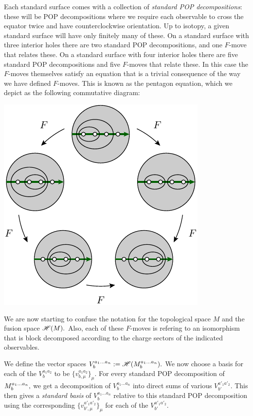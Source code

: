 \documentclass[aps, prl, letterpaper, twocolumn, superscriptaddress, notitlepage, 10pt]{revtex4-1}
\begin{document}
Each standard surface comes with a collection of
\emph{standard POP decompositions}:
these will be POP decompositions where we require each
observable to cross the
equator twice and have counterclockwise orientation.
Up to isotopy, a given standard surface will have only finitely many of these.
On a standard surface with three
interior holes there are two standard POP decompositions,
and one $F$-move that relates these.
On a standard surface with four interior holes there are five 
standard POP decompositions and five $F$-moves that relate these.
In this case the $F$-moves themselves satisfy an equation
that is a trivial consequence of the way we have defined $F$-moves.
This is known as the pentagon equation, which we depict as
the following commutative diagram:
\begin{center}
\includegraphics[]{pic-pentagon.pdf}
\end{center}
We are now starting to confuse the notation 
for the topological space $M$ and the fusion space $\mathscr{H}(M).$
Also, each of these $F$-moves is refering to an isomorphism 
that is block decomposed according to the charge sectors 
of the indicated observables.

We define the vector spaces 
$ V^{a_1...a_n}_{b} := \mathscr{H}(M^{a_1...a_n}_{b}).$ 
We now choose a basis for each of the
$V^{a_1a_2}_{b}$ to be $\{v^{a_1a_2}_{b,\mu}\}_{\mu}.$
For every standard POP decomposition of $M^{a_1...a_n}_{b},$
we get a decomposition of 
$V^{a_1...a_n}_{b}$ into direct sums of various %
$V^{a'_1a'_2}_{b'}.$ 
This then gives a \emph{standard basis} of $V^{a_1...a_n}_{b}$
relative to this standard POP decomposition
using the corresponding  $\{v^{a'_1a'_2}_{b',\mu}\}_{\mu}$
for each of the $V^{a'_1a'_2}_{b'}.$ %
\end{document}

